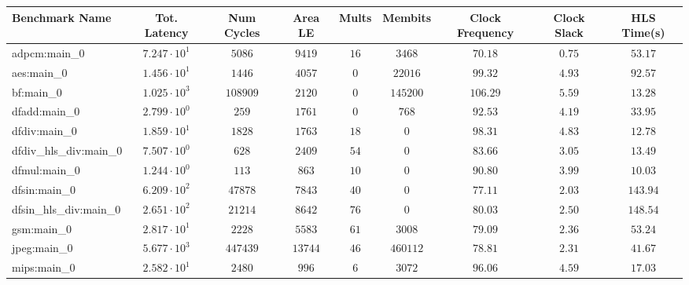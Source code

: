 \begin{tabular}{|l|c|c|c|c|c|c|c|c|}
\hline
Benchmark Name          & Tot. Latency           & Num Cycles & Area LE   & Mults   & Membits    & Clock Frequency & Clock Slack & HLS Time(s) \\
\hline
adpcm:main\_0           & $ 7.247 \cdot 10^{1} $ & $ 5086   $ & $ 9419  $ & $ 16  $ & $ 3468   $ & $ 70.18       $ & $ 0.75    $ & $ 53.17   $ \\
aes:main\_0             & $ 1.456 \cdot 10^{1} $ & $ 1446   $ & $ 4057  $ & $ 0   $ & $ 22016  $ & $ 99.32       $ & $ 4.93    $ & $ 92.57   $ \\
bf:main\_0              & $ 1.025 \cdot 10^{3} $ & $ 108909 $ & $ 2120  $ & $ 0   $ & $ 145200 $ & $ 106.29      $ & $ 5.59    $ & $ 13.28   $ \\
dfadd:main\_0           & $ 2.799 \cdot 10^{0} $ & $ 259    $ & $ 1761  $ & $ 0   $ & $ 768    $ & $ 92.53       $ & $ 4.19    $ & $ 33.95   $ \\
dfdiv:main\_0           & $ 1.859 \cdot 10^{1} $ & $ 1828   $ & $ 1763  $ & $ 18  $ & $ 0      $ & $ 98.31       $ & $ 4.83    $ & $ 12.78   $ \\
dfdiv\_hls\_div:main\_0 & $ 7.507 \cdot 10^{0} $ & $ 628    $ & $ 2409  $ & $ 54  $ & $ 0      $ & $ 83.66       $ & $ 3.05    $ & $ 13.49   $ \\
dfmul:main\_0           & $ 1.244 \cdot 10^{0} $ & $ 113    $ & $ 863   $ & $ 10  $ & $ 0      $ & $ 90.80       $ & $ 3.99    $ & $ 10.03   $ \\
dfsin:main\_0           & $ 6.209 \cdot 10^{2} $ & $ 47878  $ & $ 7843  $ & $ 40  $ & $ 0      $ & $ 77.11       $ & $ 2.03    $ & $ 143.94  $ \\
dfsin\_hls\_div:main\_0 & $ 2.651 \cdot 10^{2} $ & $ 21214  $ & $ 8642  $ & $ 76  $ & $ 0      $ & $ 80.03       $ & $ 2.50    $ & $ 148.54  $ \\
gsm:main\_0             & $ 2.817 \cdot 10^{1} $ & $ 2228   $ & $ 5583  $ & $ 61  $ & $ 3008   $ & $ 79.09       $ & $ 2.36    $ & $ 53.24   $ \\
jpeg:main\_0            & $ 5.677 \cdot 10^{3} $ & $ 447439 $ & $ 13744 $ & $ 46  $ & $ 460112 $ & $ 78.81       $ & $ 2.31    $ & $ 41.67   $ \\
mips:main\_0            & $ 2.582 \cdot 10^{1} $ & $ 2480   $ & $ 996   $ & $ 6   $ & $ 3072   $ & $ 96.06       $ & $ 4.59    $ & $ 17.03   $ \\

\end{tabular}
